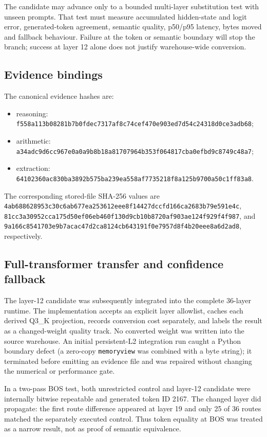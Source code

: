 The candidate may advance only to a bounded multi-layer substitution test with
unseen prompts.  That test must measure accumulated hidden-state and logit
error, generated-token agreement, semantic quality, p50/p95 latency, bytes
moved and fallback behaviour.  Failure at the token or semantic boundary will
stop the branch; success at layer 12 alone does not justify warehouse-wide
conversion.

\subsection{Evidence bindings}

The canonical evidence hashes are:
\begin{itemize}
  \item reasoning: \texttt{f558a113b08281b7b0fdec7317af8c74cef470e903ed7d54c24318d0ce3adb68};
  \item arithmetic: \texttt{a34adc9d6cc967e0a0a9b8b18a81707964b353f064817cba0efbd9c8749c48a7};
  \item extraction: \texttt{64102360ac830ba3892b575ba239ea558af7735218f8a125b9700a50c1ff83a8}.
\end{itemize}
The corresponding stored-file SHA-256 values are
\texttt{4ab688628953c30c6ab677ea253612eee8f14427dccfd166ca2683b79e591e4c},
\texttt{81cc3a30952cca175d50ef06eb460f130d9cb10b8720af903ae124f929f4f987},
and
\texttt{9a166c8541703e9b7acac47d2ca8124cb643191f0e7957d8f4b20eee8a6d2ad8},
respectively.

\subsection{Full-transformer transfer and confidence fallback}

The layer-12 candidate was subsequently integrated into the complete
36-layer runtime.  The implementation accepts an explicit layer allowlist,
caches each derived Q3\_K projection, records conversion cost separately, and
labels the result as a changed-weight quality track.  No converted weight was
written into the source warehouse.  An initial persistent-L2 integration run
caught a Python boundary defect (a zero-copy \texttt{memoryview} was combined
with a byte string); it terminated before emitting an evidence file and was
repaired without changing the numerical or performance gate.

In a two-pass BOS test, both unrestricted control and layer-12 candidate were
internally bitwise repeatable and generated token ID 2167.  The changed layer
did propagate: the first route difference appeared at layer 19 and only 25 of
36 routes matched the separately executed control.  Thus token equality at BOS
was treated as a narrow result, not as proof of semantic equivalence.

